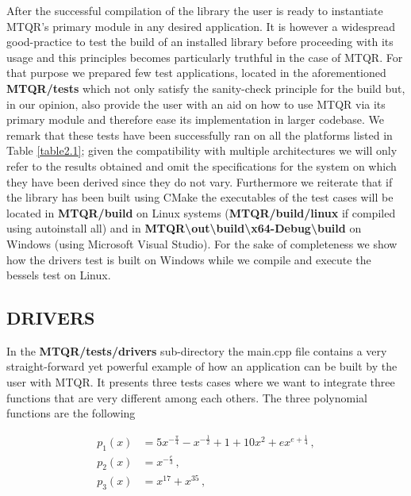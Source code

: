 \documentclass[a4paper, twosided]{book}
\begin{document}
\noindent
After the successful compilation of the library the user is ready to instantiate MTQR's primary module in any desired application. It is however a widespread good-practice to test the build of an installed library before proceeding with its usage and this principles becomes particularly truthful in the case of MTQR. For that purpose we prepared few test applications, located in the aforementioned \colorbox{poliGrayBlue}{\textbf{MTQR/tests}} which not only satisfy the sanity-check principle for the build but, in our opinion, also provide the user with an aid on how to use MTQR via its primary module and therefore ease its implementation in larger codebase. We remark that these tests have been successfully ran on all the platforms listed in Table \ref{table2.1}; given the compatibility with multiple architectures we will only refer to the results obtained and omit the specifications for the system on which they have been derived since they do not vary. Furthermore we reiterate that if the library has been built using CMake the executables of the test cases will be located in \colorbox{poliGrayBlue}{\textbf{MTQR/build}} on Linux systems (\colorbox{poliGrayBlue}{\textbf{MTQR/build/linux}} if compiled using \colorbox{poliGrayBlue}{autoinstall all}) and in \colorbox{poliGrayBlue}{\textbf{MTQR\textbackslash out\textbackslash build\textbackslash x64-Debug\textbackslash build}} on Windows (using Microsoft Visual Studio). For the sake of completeness we show how the \colorbox{poliGrayBlue}{drivers} test is built on Windows while we compile and execute the \colorbox{poliGrayBlue}{bessels} test on Linux.

\subsection[Drivers]{\changefont DRIVERS}\label{SubSec2.4.1}

In the \colorbox{poliGrayBlue}{\textbf{MTQR/tests/drivers}} sub-directory the \colorbox{poliGrayBlue}{main.cpp} file contains a very straight-forward yet powerful example of how an application can be built by the user with MTQR. It presents three tests cases where we want to integrate three functions that are very different among each others. The three polynomial functions are the following

\begin{equation*}
    \begin{split}
        p_1(x) & = 5x^{-\frac{\pi}{4}}-x^{-\frac{1}{2}}+1+10x^{2}+ex^{e+\frac{1}{4}}\,, \\
        p_2(x) & = x^{-\frac{e}{3}}\,, \\
        p_3(x) & = x^{17} + x^{35}\,,
    \end{split}
\end{equation*}
\end{document}
